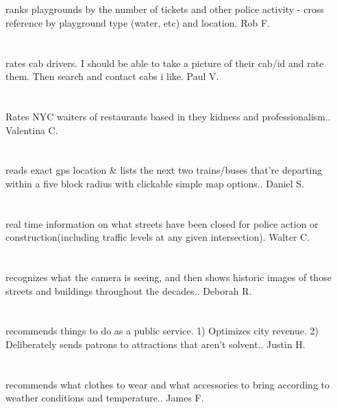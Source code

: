 \section{}ranks playgrounds by the number of tickets and other police activity - cross reference by playground type (water,  etc) and location. Rob F.
\section{}rates cab drivers.  I should be able to take a picture of their cab/id and rate them. Then search and contact cabs i like. Paul V.
\section{}Rates NYC waiters of restaurants based in they kidness and professionalism.. Valentina C.
\section{}reads exact gps location \& lists the next two trains/buses that're departing within a five block radius with clickable simple map options.. Daniel S.
\section{}real time information on what streets have been closed for police action or construction(including traffic levels at any given intersection). Walter C.
\section{}recognizes what the camera is seeing,  and then shows historic images of those streets and buildings throughout the decades.. Deborah R.
\section{}recommends things to do as a public service. 1) Optimizes city revenue. 2) Deliberately sends patrons to attractions that aren't solvent.. Justin H.
\section{}recommends what clothes to wear and what accessories to bring according to weather conditions and temperature.. James F.
